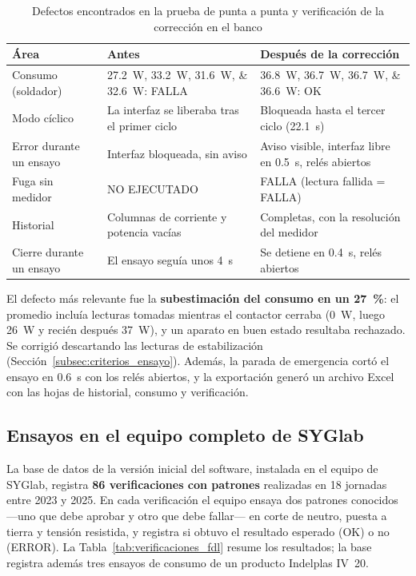 \begin{table}[htbp]
\centering
\caption{Defectos encontrados en la prueba de punta a punta y verificación de la
         corrección en el banco}
\label{tab:resultados_e2e}
\renewcommand{\arraystretch}{1.25}
\small
\begin{tabularx}{\linewidth}{@{} l X X @{}}
\toprule
\textbf{Área} & \textbf{Antes} & \textbf{Después de la corrección} \\
\midrule
Consumo (soldador)
  & \SIlist{27,2;33,2;31,6;32,6}{\watt}: FALLA
  & \SIlist{36,8;36,7;36,7;36,6}{\watt}: OK \\
Modo cíclico
  & La interfaz se liberaba tras el primer ciclo
  & Bloqueada hasta el tercer ciclo (\SI{22,1}{\second}) \\
Error durante un ensayo
  & Interfaz bloqueada, sin aviso
  & Aviso visible, interfaz libre en \SI{0,5}{\second}, relés abiertos \\
Fuga sin medidor
  & NO EJECUTADO
  & FALLA (lectura fallida = FALLA) \\
Historial
  & Columnas de corriente y potencia vacías
  & Completas, con la resolución del medidor \\
Cierre durante un ensayo
  & El ensayo seguía unos \SI{4}{\second}
  & Se detiene en \SI{0,4}{\second}, relés abiertos \\
\bottomrule
\end{tabularx}
\end{table}

El defecto más relevante fue la \textbf{subestimación del consumo en un
\SI{27}{\percent}}: el promedio incluía lecturas tomadas mientras el contactor
cerraba (\SI{0}{\watt}, luego \SI{26}{\watt} y recién después \SI{37}{\watt}), y
un aparato en buen estado resultaba rechazado. Se corrigió descartando las
lecturas de estabilización (Sección~\ref{subsec:criterios_ensayo}). Además, la
parada de emergencia cortó el ensayo en \SI{0,6}{\second} con los relés abiertos,
y la exportación generó un archivo Excel con las hojas de historial, consumo y
verificación.

\subsection{Ensayos en el equipo completo de SYGlab}
\label{subsec:resultados_syglab}

La base de datos de la versión inicial del software, instalada en el equipo de
SYGlab, registra \textbf{86 verificaciones con patrones} realizadas en 18
jornadas entre 2023 y 2025. En cada verificación el equipo ensaya dos patrones
conocidos ---uno que debe aprobar y otro que debe fallar--- en corte de neutro,
puesta a tierra y tensión resistida, y registra si obtuvo el resultado esperado
(OK) o no (ERROR). La Tabla~\ref{tab:verificaciones_fdl} resume los resultados;
la base registra además tres ensayos de consumo de un producto Indelplas IV~20.

